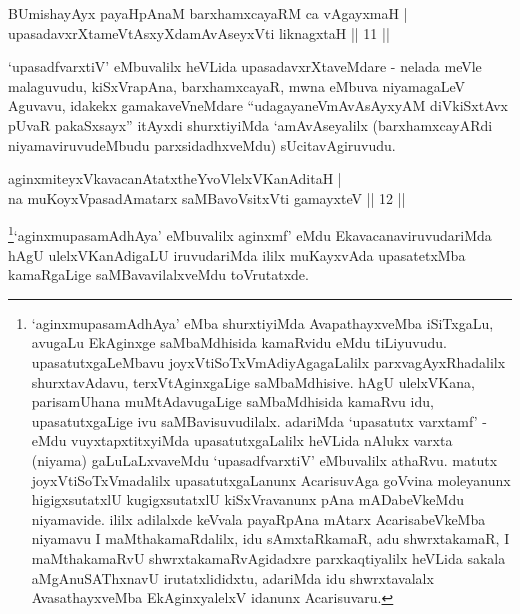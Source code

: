 \begin{shl}
BUmishayAyx payaHpAnaM barxhamxcayaRM ca vAgayxmaH | \\
upasadavxrXtameVtAsxyXdamAvAseyxVti liknagxtaH \hfill|| 11 || 
\end{shl}

\begin{artha}
`upasadfvarxtiV' eMbuvalilx heVLida upasadavxrXtaveMdare - nelada meVle malaguvudu, kiSxVrapAna, barxhamxcayaR, mwna eMbuva niyamagaLeV Aguvavu, idakekx gamakaveVneMdare ``udagayaneV\s mAvAsAyxyAM diVkiSxtAvx pUvaR pakaSxsayx'' itAyxdi shurxtiyiMda `amAvAseyalilx (barxhamxcayARdi niyamaviruvudeMbudu parxsidadhxveMdu) sUcitavAgiruvudu.
\end{artha}


\begin{shl}
aginxmiteyxVkavacanAtatxtheYvoVlelxVKanAditaH | \\
na muKoyxVpasadAmatarx saMBavoV\s sitxVti gamayxteV \hfill|| 12 || 
\end{shl}

\begin{artha}
\footnote{`aginxmupasamAdhAya' eMba shurxtiyiMda AvapathayxveMba iSiTxgaLu, avugaLu EkAginxge saMbaMdhisida kamaRvidu eMdu tiLiyuvudu. upasatutxgaLeMbavu joyxVtiSoTxVmAdiyAgagaLalilx parxvagAyxRhadalilx shurxtavAdavu, terxVtAginxgaLige saMbaMdhisive. hAgU ulelxVKana, parisamUhana muMtAdavugaLige saMbaMdhisida kamaRvu idu, upasatutxgaLige ivu saMBavisuvudilalx. adariMda `upasatutx varxtamf' - eMdu vuyxtapxtitxyiMda upasatutxgaLalilx heVLida nAlukx varxta (niyama) gaLuLaLxvaveMdu `upasadfvarxtiV' eMbuvalilx athaRvu. matutx joyxVtiSoTxVmadalilx upasatutxgaLanunx AcarisuvAga goVvina moleyanunx higigxsutatxlU kugigxsutatxlU kiSxVravanunx pAna mADabeVkeMdu niyamavide. ililx adilalxde keVvala payaRpAna mAtarx AcarisabeVkeMba niyamavu I maMthakamaRdalilx, idu sAmxtaRkamaR, adu shwrxtakamaR, I maMthakamaRvU shwrxtakamaRvAgidadxre parxkaqtiyalilx heVLida sakala aMgAnuSAThxnavU irutatxlididxtu, adariMda idu shwrxtavalalx AvasathayxveMba EkAginxyalelxV idanunx Acarisuvaru.}`aginxmupasamAdhAya' eMbuvalilx aginxmf' eMdu EkavacanaviruvudariMda hAgU ulelxVKanAdigaLU iruvudariMda ililx muKayxvAda upasatetxMba kamaRgaLige saMBavavilalxveMdu toVrutatxde.
\end{artha}


